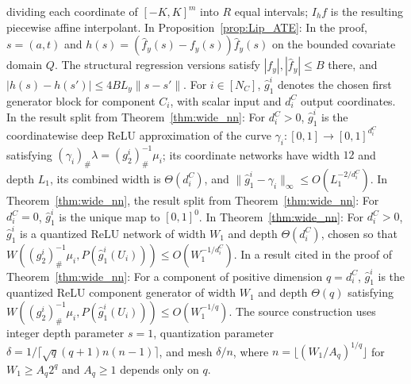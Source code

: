dividing each coordinate of $[-K,K]^m$ into $R$ equal intervals; $I_hf$ is the resulting piecewise affine interpolant. In Proposition~\ref{prop:Lip_ATE}: In the proof, $s=(a,t)$ and $h(s)=(\hat f_y(s)-f_y(s))\hat f_y(s)$ on the bounded covariate domain $Q$. The structural regression versions satisfy $|f_y|,|\hat f_y|\leqslant B$ there, and $|h(s)-h(s')|\leqslant4BL_y\|s-s'\|$. For $i\in[N_C]$, $\hat{g}_1^i$ denotes the chosen first generator block for component $C_i$, with scalar input and $d_i^C$ output coordinates. In the result split from Theorem~\ref{thm:wide_nn}: For $d_i^C>0$, $\hat{g}_1^i$ is the coordinatewise deep ReLU approximation of the curve $\gamma_i:[0,1]\rightarrow[0,1]^{d_i^C}$ satisfying $(\gamma_i)_{\#}\lambda=(g_2^i)^{-1}_{\#}\mu_i$; its coordinate networks have width $12$ and depth $L_1$, its combined width is $\Theta(d_i^C)$, and $\|\hat{g}_1^i-\gamma_i\|_\infty\leqslant O(L_1^{-2/d_i^C})$. In Theorem~\ref{thm:wide_nn}, the result split from Theorem~\ref{thm:wide_nn}: For $d_i^C=0$, $\hat{g}_1^i$ is the unique map to $[0,1]^0$. In Theorem~\ref{thm:wide_nn}: For $d_i^C>0$, $\hat{g}_1^i$ is a quantized ReLU network of width $W_1$ and depth $\Theta(d_i^C)$, chosen so that $W((g_2^i)^{-1}_{\#}\mu_i,P(\hat{g}_1^i(U_i)))\leqslant O(W_1^{-1/d_i^C})$. In a result cited in the proof of Theorem~\ref{thm:wide_nn}: For a component of positive dimension $q=d_i^C$, $\hat{g}_1^i$ is the quantized ReLU component generator of width $W_1$ and depth $\Theta(q)$ satisfying $W((g_2^i)^{-1}_{\#}\mu_i,P(\hat{g}_1^i(U_i)))\leqslant O(W_1^{-1/q})$. The source construction uses integer depth parameter $s=1$, quantization parameter $\delta=1/\lceil\sqrt q(q+1)n(n-1)\rceil$, and mesh $\delta/n$, where $n=\lfloor(W_1/A_q)^{1/q}\rfloor$ for $W_1\geqslant A_q2^q$ and $A_q\geqslant1$ depends only on $q$.

